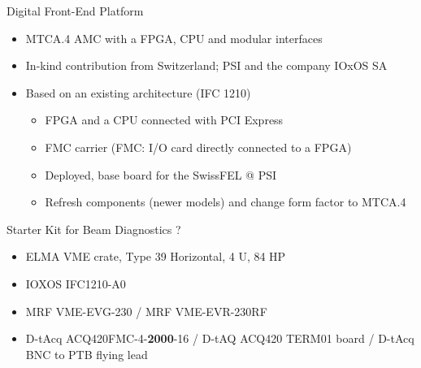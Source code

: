 \documentclass[
  9pt
  , table
  , ignorenonframetext
]{beamer}
\begin{document}
\begin{frame}{Digital Front-End Platform}
  \begin{itemize}
  \item MTCA.4 AMC with a FPGA, CPU and modular interfaces
  \item In-kind contribution from Switzerland; PSI and the company IOxOS SA
  \item Based on an existing architecture (IFC 1210)
    \begin{itemize}
    \item FPGA and a CPU connected with PCI Express
    \item FMC carrier (FMC: I/O card directly connected to a FPGA)
    \item Deployed, base board for the SwissFEL @ PSI
    \item Refresh components (newer models) and change form factor to MTCA.4
    \end{itemize}
  \end{itemize}
  \begin{exampleblock}{Starter Kit for Beam Diagnostics ? }
    \begin{itemize}
    \item ELMA VME crate, Type 39 Horizontal, 4 U, 84 HP 
    \item IOXOS IFC1210-A0 
    \item MRF VME-EVG-230 / MRF VME-EVR-230RF
    \item D-tAcq ACQ420FMC-4-\textbf{2000}-16 / D-tAQ ACQ420 TERM01 board / D-tAcq BNC to PTB flying lead
     \end{itemize}
  \end{exampleblock}
\end{frame}
\end{document}

